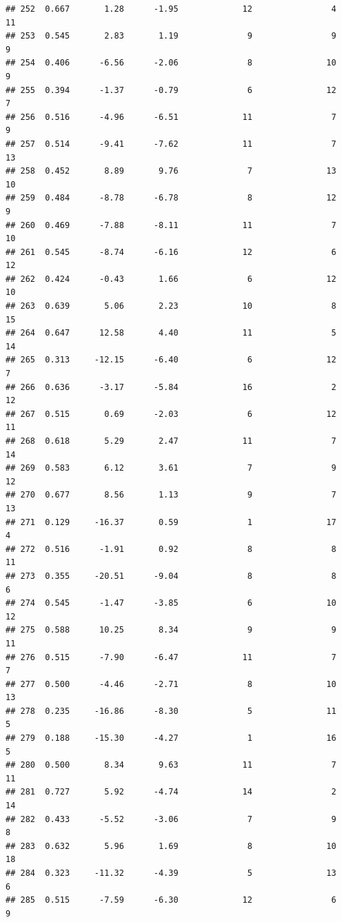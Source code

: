 \documentclass[]{book}
\begin{document}
\begin{verbatim}
## 252  0.667       1.28      -1.95             12                4       11
## 253  0.545       2.83       1.19              9                9        9
## 254  0.406      -6.56      -2.06              8               10        9
## 255  0.394      -1.37      -0.79              6               12        7
## 256  0.516      -4.96      -6.51             11                7        9
## 257  0.514      -9.41      -7.62             11                7       13
## 258  0.452       8.89       9.76              7               13       10
## 259  0.484      -8.78      -6.78              8               12        9
## 260  0.469      -7.88      -8.11             11                7       10
## 261  0.545      -8.74      -6.16             12                6       12
## 262  0.424      -0.43       1.66              6               12       10
## 263  0.639       5.06       2.23             10                8       15
## 264  0.647      12.58       4.40             11                5       14
## 265  0.313     -12.15      -6.40              6               12        7
## 266  0.636      -3.17      -5.84             16                2       12
## 267  0.515       0.69      -2.03              6               12       11
## 268  0.618       5.29       2.47             11                7       14
## 269  0.583       6.12       3.61              7                9       12
## 270  0.677       8.56       1.13              9                7       13
## 271  0.129     -16.37       0.59              1               17        4
## 272  0.516      -1.91       0.92              8                8       11
## 273  0.355     -20.51      -9.04              8                8        6
## 274  0.545      -1.47      -3.85              6               10       12
## 275  0.588      10.25       8.34              9                9       11
## 276  0.515      -7.90      -6.47             11                7        7
## 277  0.500      -4.46      -2.71              8               10       13
## 278  0.235     -16.86      -8.30              5               11        5
## 279  0.188     -15.30      -4.27              1               16        5
## 280  0.500       8.34       9.63             11                7       11
## 281  0.727       5.92      -4.74             14                2       14
## 282  0.433      -5.52      -3.06              7                9        8
## 283  0.632       5.96       1.69              8               10       18
## 284  0.323     -11.32      -4.39              5               13        6
## 285  0.515      -7.59      -6.30             12                6        9

\end{verbatim}
\end{document}
